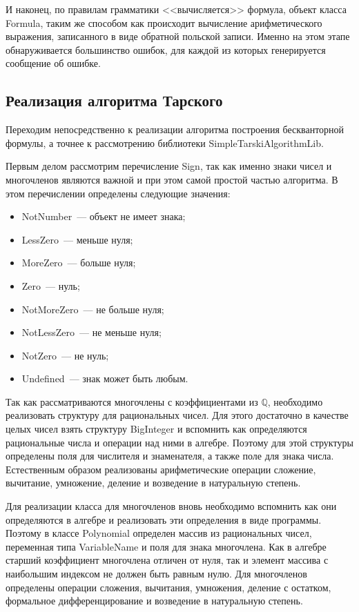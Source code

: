 И наконец, по правилам грамматики <<вычисляется>> формула, объект класса Formula, таким же способом как происходит вычисление арифметического выражения, записанного в виде обратной польской записи. Именно на этом этапе обнаруживается большинство ошибок, для каждой из которых генерируется сообщение об ошибке.

\subsection{Реализация алгоритма Тарского}

Переходим непосредственно к реализации алгоритма построения бескванторной формулы, а точнее к рассмотрению библиотеки SimpleTarskiAlgorithmLib.

Первым делом рассмотрим перечисление Sign, так как именно знаки чисел и многочленов являются важной и при этом самой простой частью алгоритма. В этом перечислении определены следующие значения:
\begin{itemize}
    \item NotNumber~--- объект не имеет знака;
    \item LessZero~--- меньше нуля;
    \item MoreZero~--- больше нуля;
    \item Zero~--- нуль;
    \item NotMoreZero~--- не больше нуля;
    \item NotLessZero~--- не меньше нуля;
    \item NotZero~--- не нуль; 
    \item Undefined~--- знак может быть любым.
\end{itemize}

Так как рассматриваются многочлены с коэффициентами из $\mathbb{Q}$, необходимо реализовать структуру для рациональных чисел. Для этого достаточно в качестве целых чисел взять структуру BigInteger и вспомнить как определяются рациональные числа и операции над ними в алгебре. Поэтому для этой структуры определены поля для числителя и знаменателя, а также поле для знака числа. Естественным образом реализованы арифметические операции сложение, вычитание, умножение, деление и возведение в натуральную степень.

Для реализации класса для многочленов вновь необходимо вспомнить как они определяются в алгебре и реализовать эти определения в виде программы. Поэтому в классе Polynomial определен массив из рациональных чисел, переменная типа VariableName и поля для знака многочлена. Как в алгебре старший коэффициент многочлена отличен от нуля, так и элемент массива с наибольшим индексом не должен быть равным нулю. Для многочленов определены операции сложения, вычитания, умножения, деление с остатком, формальное дифференцирование и возведение в натуральную степень.

